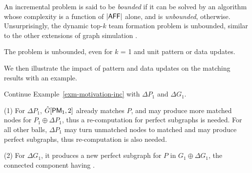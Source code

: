 An incremental problem is said to be {\em bounded} if it can be solved by an algorithm whose complexity is a function of $|{\mathsf{AFF}}|$ alone, and is {\em unbounded}, otherwise. Unsurprisingly, the dynamic top-$k$ team formation problem is unbounded, similar to the other extensions of graph simulation \cite{FanLMTWW10,FanWW13-tods}.


\begin{prop}
\label{thm-inc-grouprec-pat}
The \dynteamF{} problem is unbounded, even for $k$ = 1 and unit pattern or data updates.
\end{prop}


We then illustrate the impact of pattern and data updates on the matching results with an example.


\begin{example}
\label{exm-pattern-challenge}
Continue Example~\ref{exm-motivation-inc} with $\Delta P_1$ and $\Delta G_1$.


\sstab
(1) For $\Delta P_1$, $\hat{G}{[{\mathsf{PM_1}}, 2]}$ already matches $P$, and may produce more matched nodes for $P_1\oplus \Delta P_1$,
thus a re-computation for perfect subgraphs is needed.
For all other balls, $\Delta P_1$ may turn unmatched nodes to matched and may produce perfect subgraphs,
thus re-computation is also needed.

\sstab
(2) For $\Delta G_1$, it produces a new perfect subgraph for $P$ in $G_1\oplus\Delta G_1$,
\ie the connected component having .
\end{example}



